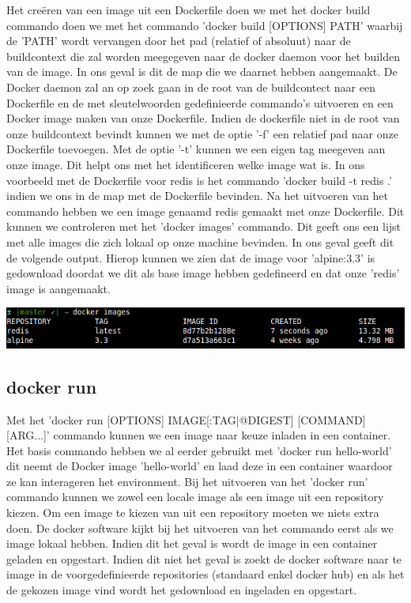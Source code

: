 Het creëren van een image uit een Dockerfile doen we met het docker build commando doen we met het commando 'docker build [OPTIONS] PATH' waarbij de 'PATH' wordt vervangen door het pad (relatief of absoluut) naar de buildcontext die zal worden meegegeven naar de docker daemon voor het builden van de image. In ons geval is dit de map die we daarnet hebben aangemaakt. De Docker daemon zal an op zoek gaan in de root van de buildcontect naar een Dockerfile en de met sleutelwoorden gedefinieerde commando's uitvoeren en een Docker image maken van onze Dockerfile. Indien de dockerfile niet in de root van onze buildcontext bevindt kunnen we met de optie '-f' een relatief pad naar onze Dockerfile toevoegen. Met de optie '-t' kunnen we een eigen tag meegeven aan onze image. Dit helpt ons met het identificeren welke image wat is. In ons voorbeeld met de Dockerfile voor redis is het commando 'docker build -t redis .' indien we ons in de map met de Dockerfile bevinden. Na het uitvoeren van het commando hebben we een image genaamd redis gemaakt met onze Dockerfile. Dit kunnen we controleren met het 'docker images' commando. Dit geeft ons een lijst met alle images die zich lokaal op onze machine bevinden. In ons geval geeft dit de volgende output. Hierop kunnen we zien dat de image voor 'alpine:3.3' is gedownload doordat we dit als base image hebben gedefineerd en dat onze 'redis' image is aangemaakt.

\includegraphics[scale=0.55]{img/dockerImages.png}


\subsection{docker run}

Met het 'docker run [OPTIONS] IMAGE[:TAG|@DIGEST] [COMMAND] [ARG...]' commando kunnen we een image naar keuze inladen in een container. Het basis commando hebben we al eerder gebruikt met 'docker run hello-world' dit neemt de Docker image 'hello-world' en laad deze in een container waardoor ze kan interageren het environment. Bij het uitvoeren van het 'docker run' commando kunnen we zowel een locale image als een image uit een repository kiezen. Om een image te kiezen van uit een repository moeten we niets extra doen. De docker software kijkt bij het uitvoeren van het commando eerst als we image lokaal hebben. Indien dit het geval is wordt de image in een container geladen en opgestart. Indien dit niet het geval is zoekt de docker software naar te image in de voorgedefinieerde repositories (standaard enkel docker hub) en als het de gekozen image vind wordt het gedownload en ingeladen en opgestart.

